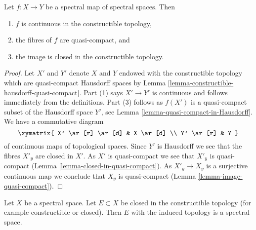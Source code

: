 \begin{lemma}
\label{lemma-fibres-spectral-map-quasi-compact}
Let $f : X \to Y$ be a spectral map of spectral spaces. Then
\begin{enumerate}
\item $f$ is continuous in the constructible topology,
\item the fibres of $f$ are quasi-compact, and
\item the image is closed in the constructible topology.
\end{enumerate}
\end{lemma}

\begin{proof}
Let $X'$ and $Y'$ denote $X$ and $Y$ endowed with the constructible topology
which are quasi-compact Hausdorff spaces by
Lemma \ref{lemma-constructible-hausdorff-quasi-compact}.
Part (1) says $X' \to Y'$ is continuous and follows immediately from the
definitions. Part (3) follows as $f(X')$ is a quasi-compact subset of the
Hausdorff space $Y'$, see Lemma \ref{lemma-quasi-compact-in-Hausdorff}.
We have a commutative diagram
$$
\xymatrix{
X' \ar[r] \ar[d] & X \ar[d] \\
Y' \ar[r] & Y
}
$$
of continuous maps of topological spaces. Since $Y'$ is Hausdorff
we see that the fibres $X'_y$ are closed in $X'$. As $X'$ is quasi-compact
we see that $X'_y$ is quasi-compact
(Lemma \ref{lemma-closed-in-quasi-compact}).
As $X'_y \to X_y$ is a surjective continuous map we conclude
that $X_y$ is quasi-compact (Lemma \ref{lemma-image-quasi-compact}).
\end{proof}

\begin{lemma}
\label{lemma-spectral-sub}
Let $X$ be a spectral space. Let $E \subset X$ be closed in the constructible
topology (for example constructible or closed). Then $E$ with the induced
topology is a spectral space.
\end{lemma}

